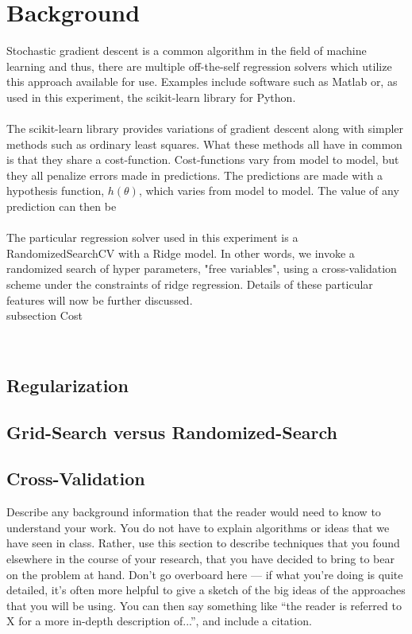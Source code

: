 
\section{Background}
\label{sec:background}

Stochastic gradient descent is a common algorithm in the field of machine
learning and thus, there are multiple off-the-self regression solvers which
utilize this approach available for use. Examples include software 
such as Matlab or, as used in this experiment, the scikit-learn library for Python.
\\ \\
The scikit-learn library provides variations of gradient descent along with 
simpler methods such as ordinary least squares. What these methods all
have in common is that they share a cost-function. Cost-functions vary from
model to model, but they all penalize errors made in predictions. The predictions
are made with a hypothesis function, $h(\theta)$, which varies from model
to model. The value of any prediction can then be 
\\ \\
The particular regression solver used in this experiment is a RandomizedSearchCV 
with a Ridge model. In other words, we invoke a randomized search of hyper parameters, "free variables", using a cross-validation scheme under the constraints of ridge regression. 
Details of these particular features will now be further discussed.
\\
subsection {Cost}




\\
\subsection{Regularization}



\subsection{Grid-Search versus Randomized-Search}

\subsection{Cross-Validation}


Describe any background information that the reader would need to know
to understand your work. You do not have to explain algorithms or
ideas that we have seen in class. Rather, use this section to describe
techniques that you found elsewhere in the course of your research,
that you have decided to bring to bear on the problem at hand. Don't
go overboard here --- if what you're doing is quite detailed, it's
often more helpful to give a sketch of the big ideas of the approaches
that you will be using. You can then say something like ``the reader
is referred to X for a more in-depth description of...'', and include
a citation.\\

